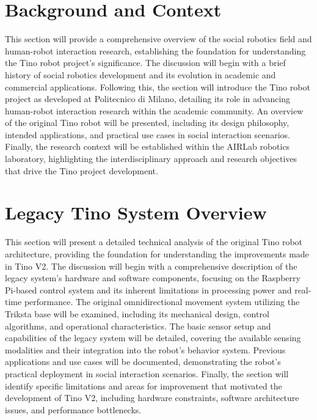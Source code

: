 \section{Background and Context}
This section will provide a comprehensive overview of the social robotics field and human-robot interaction research, establishing the foundation for understanding the Tino robot project's significance. The discussion will begin with a brief history of social robotics development and its evolution in academic and commercial applications. Following this, the section will introduce the Tino robot project as developed at Politecnico di Milano, detailing its role in advancing human-robot interaction research within the academic community. An overview of the original Tino robot will be presented, including its design philosophy, intended applications, and practical use cases in social interaction scenarios. Finally, the research context will be established within the AIRLab robotics laboratory, highlighting the interdisciplinary approach and research objectives that drive the Tino project development.

\section{Legacy Tino System Overview}
This section will present a detailed technical analysis of the original Tino robot architecture, providing the foundation for understanding the improvements made in Tino V2. The discussion will begin with a comprehensive description of the legacy system's hardware and software components, focusing on the Raspberry Pi-based control system and its inherent limitations in processing power and real-time performance. The original omnidirectional movement system utilizing the Triksta base will be examined, including its mechanical design, control algorithms, and operational characteristics. The basic sensor setup and capabilities of the legacy system will be detailed, covering the available sensing modalities and their integration into the robot's behavior system. Previous applications and use cases will be documented, demonstrating the robot's practical deployment in social interaction scenarios. Finally, the section will identify specific limitations and areas for improvement that motivated the development of Tino V2, including hardware constraints, software architecture issues, and performance bottlenecks.

